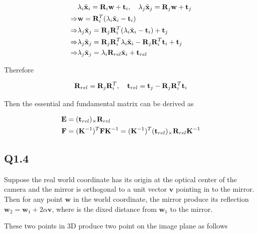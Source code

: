 \documentclass[11pt]{article}
\begin{document}
\begin{align}
    & \lambda_i \tilde{\mathbf{x}}_i = \mathbf{R}_i \mathbf{w} + \mathbf{t}_i, \quad
    \lambda_j \tilde{\mathbf{x}}_j = \mathbf{R}_j \mathbf{w} + \mathbf{t}_j
    \nonumber \\ \Rightarrow &
    \mathbf{w} = \mathbf{R}_i ^T (\lambda_i \tilde{\mathbf{x}}_i - \mathbf{t}_i)
    \nonumber \\ \Rightarrow &
    \lambda_j \tilde{\mathbf{x}}_j = \mathbf{R}_j \mathbf{R}_i ^T (\lambda_i \tilde{\mathbf{x}}_i - \mathbf{t}_i) + \mathbf{t}_j
    \nonumber \\ \Rightarrow &
    \lambda_j \tilde{\mathbf{x}}_j = \mathbf{R}_j \mathbf{R}_i ^T \lambda_i \tilde{\mathbf{x}}_i - \mathbf{R}_j \mathbf{R}_i ^T \mathbf{t}_i + \mathbf{t}_j
    \nonumber \\ \Rightarrow &
    \lambda_j \tilde{\mathbf{x}}_j = \lambda_i \mathbf{R}_{rel} \tilde{\mathbf{x}}_i + \mathbf{t}_{rel}
\end{align}

Therefore

\begin{align}
    \mathbf{R}_{rel} = \mathbf{R}_j \mathbf{R}_i ^T, \quad
    \mathbf{t}_{rel} = \mathbf{t}_j - \mathbf{R}_j \mathbf{R}_i ^T \mathbf{t}_i
\end{align}

Then the essential and fundamental matrix can be derived as

\begin{align}
  \mathbf{E} &= (\mathbf{t}_{rel})_\times \mathbf{R}_{rel} \\
  \mathbf{F} &= (\mathbf{K}^{-1})^T \mathbf{F} \mathbf{K}^{-1} = (\mathbf{K}^{-1})^T (\mathbf{t}_{rel})_\times \mathbf{R}_{rel} \mathbf{K}^{-1}
\end{align}

\newpage

\subsection*{Q1.4}

\newcommand {\bv} {\mathbf{v}}
\newcommand {\bH} {\mathbf{H}}
\newcommand {\bI} {\mathbf{I}}
\newcommand {\bw} {\mathbf{w}}

Suppose the real world coordinate has its origin at the optical center of the camera and the mirror is orthogonal to a unit vector $\bv$ pointing in to the mirror. Then for any point $\bw$ in the world coordinate, the mirror produce its reflection $\bw_2=\bw_1 + 2\alpha\bv$, where is the dixed distance from $\bw_1$ to the mirror.

These two points in 3D produce two point on the image plane as follows
\end{document}
